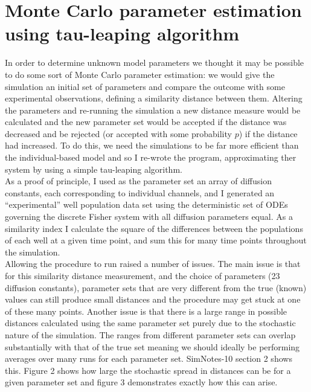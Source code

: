 \documentclass[a4paper,10pt]{article}
\begin{document}
 
 
 
 
 
 \clearpage
 \newpage
 
\section{Monte Carlo parameter estimation using tau-leaping algorithm}
In order to determine unknown model parameters we thought it may be possible to do some sort of Monte Carlo parameter estimation: we would give the simulation an
initial set of parameters and compare the outcome with some experimental observations, defining a similarity distance between them. Altering the parameters
and re-running the simulation a new distance measure would be calculated and the new parameter set would be accepted if the distance was decreased and be rejected
(or accepted with some probability $p$) if the distance had increased. To do this, we need the simulations to be far more efficient than the individual-based model
and so I re-wrote the program, approximating ther system by using a simple tau-leaping algorithm.\\

As a proof of principle, I used as the parameter set an array of diffusion constants, each corresponding to individual channels, and 
I generated an ``experimental'' well population data set using the deterministic set of ODEs governing the discrete Fisher system with all diffusion parameters equal. 
As a similarity index I calculate the square of the differences between the populations of each well at a given time point, and sum this for many time points
throughout the simulation.\\

Allowing the procedure to run raised a number of issues. The main issue is that for this similarity distance measurement, and the choice of parameters (23 diffusion
constants), parameter sets that are very different from the true (known) values can still produce small distances and the procedure may get stuck at one of these many points.
Another issue is that there is a large range in possible distances calculated using the same parameter set purely due to the stochastic nature of the simulation. 
The ranges from different parameter sets can overlap substantially with that of the true set meaning we should ideally be performing averages over many runs for each 
parameter set. SimNotes-10 section 2 shows this. Figure 2 shows how large the stochastic spread in distances can be for a given parameter set and figure 3 demonstrates
exactly how this can arise.\\
\end{document}
